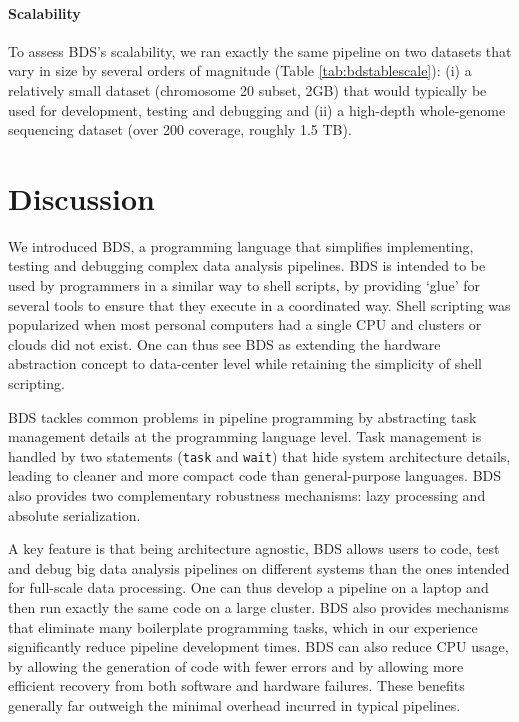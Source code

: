 
\paragraph{Scalability} To assess BDS’s scalability, we ran exactly the same pipeline on two datasets that vary in size by several orders of magnitude (Table \ref{tab:bdstablescale}): (i) a relatively small dataset (chromosome 20 subset, 2GB) that would typically be used for development, testing and debugging and (ii) a high-depth whole-genome sequencing dataset (over 200 coverage, roughly 1.5 TB).
 

\section{Discussion}

We introduced BDS, a programming language that simplifies implementing, testing and debugging complex data analysis pipelines. BDS is intended to be used by programmers in a similar way to shell scripts, by providing ‘glue’ for several tools to ensure that they execute in a coordinated way. Shell scripting was popularized when most personal computers had a single CPU and clusters or clouds did not exist. One can thus see BDS as extending the hardware abstraction concept to data-center level while retaining the simplicity of shell scripting.

BDS tackles common problems in pipeline programming by abstracting task management details at the programming language level. Task management is handled by two statements (\texttt{task} and \texttt{wait}) that hide system architecture details, leading to cleaner and more compact code than general-purpose languages. BDS also provides two complementary robustness mechanisms: lazy processing and absolute serialization.

A key feature is that being architecture agnostic, BDS allows users to code, test and debug big data analysis pipelines on different systems than the ones intended for full-scale data processing. One can thus develop a pipeline on a laptop and then run exactly the same code on a large cluster. BDS also provides mechanisms that eliminate many boilerplate programming tasks, which in our experience significantly reduce pipeline development times. BDS can also reduce CPU usage, by allowing the generation of code with fewer errors and by allowing more efficient recovery from both software and hardware failures. These benefits generally far outweigh the minimal overhead incurred in typical pipelines.

